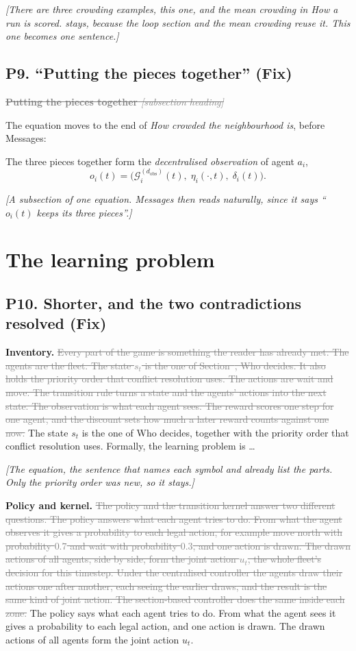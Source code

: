 \documentclass[11pt,a4paper]{article}
\newcommand{\new}[1]{\textcolor{newc}{#1}}
\newcommand{\old}[1]{\textcolor{gray}{\sout{#1}}}
\newcommand{\note}[1]{{\small\itshape [#1]}}
\newcommand{\lab}[1]{\textsf{\footnotesize\detokenize{#1}}}
\renewcommand{\ref}[1]{\lab{#1}}
\newcommand{\pitem}[2]{\subsection*{P#1. #2}}
\begin{document}
\note{There are three crowding examples, this one, \lab{fig:crowding} and the
mean crowding in How a run is scored. \lab{fig:crowding} stays, because the
loop section and the mean crowding reuse it. This one becomes one sentence.}

\pitem{9}{``Putting the pieces together'' (Fix)}
\old{\textbf{Putting the pieces together} \note{subsection heading}}

The equation moves to the end of \emph{How crowded the neighbourhood is},
before Messages:

\new{The three pieces together form the \emph{decentralised observation} of
agent $a_i$,}
\[ o_i(t) = \bigl( \mathcal{G}^{(d_{\mathrm{obs}})}_i(t),\; \eta_i(\cdot, t),\; \delta_i(t) \bigr). \]

\note{A subsection of one equation. Messages then reads naturally, since it
says ``$o_i(t)$ keeps its three pieces''.}

\section*{The learning problem}

\pitem{10}{Shorter, and the two contradictions resolved (Fix)}
\textbf{Inventory.}
\old{Every part of the game is something the reader has already met. The
agents are the fleet. The state $s_t$ is the one of
Section~\ref{sec:pf:controllers}, Who decides. It also holds the priority
order that conflict resolution uses. The actions are wait and move. The
transition rule turns a state and the agents' actions into the next state.
The observation is what each agent sees. The reward scores one step for one
agent, and the discount sets how much a later reward counts against one
now.} \new{The state $s_t$ is the one of Who decides, together with the
priority order that conflict resolution uses.} Formally, the learning problem
is \dots

\note{The equation, the sentence that names each symbol and
\lab{tab:posg} already list the parts. Only the priority order was new, so
it stays.}

\textbf{Policy and kernel.}
\old{The policy and the transition kernel answer two different questions.
The policy answers what each agent tries to do. From what the agent observes
it gives a probability to each legal action, for example move north with
probability $0.7$ and wait with probability $0.3$, and one action is drawn.
The drawn actions of all agents, side by side, form the joint action $u_t$,
the whole fleet's decision for this timestep. Under the centralised
controller the agents draw their actions one after another, each seeing the
earlier draws, and the result is the same kind of joint action. The
section-based controller does the same inside each zone.}
\new{The policy says what each agent tries to do. From what the agent sees it
gives a probability to each legal action, and one action is drawn. The drawn
actions of all agents form the joint action $u_t$.}
\end{document}
